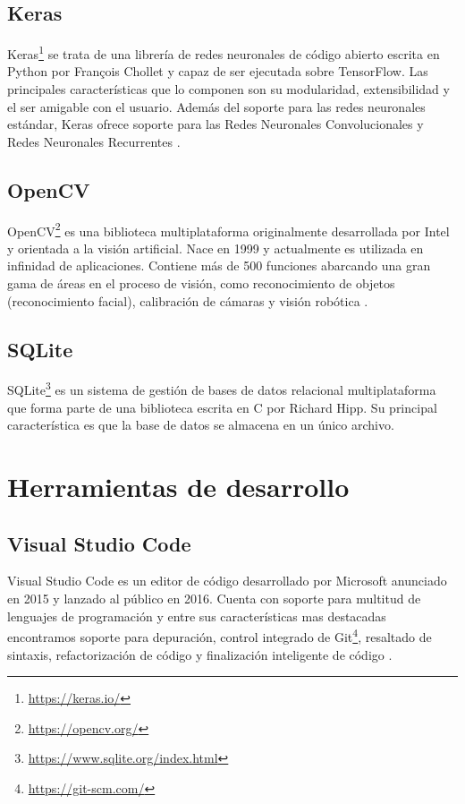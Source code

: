 \subsection{Keras}
Keras\footnote{\url{https://keras.io/}} se trata de una librería de redes neuronales de código abierto escrita en Python por François Chollet y capaz de ser ejecutada sobre TensorFlow. Las principales características que lo componen son su modularidad, extensibilidad y el ser amigable con el usuario. Además del soporte para las redes neuronales estándar, Keras ofrece soporte para las Redes Neuronales Convolucionales y Redes Neuronales Recurrentes \cite{wiki:keras}.


\subsection{OpenCV}
OpenCV\footnote{\url{https://opencv.org/}} es una biblioteca multiplataforma originalmente desarrollada por Intel y orientada a la visión artificial. Nace en 1999 y actualmente es utilizada en infinidad de aplicaciones. Contiene más de 500 funciones abarcando una gran gama de áreas en el proceso de visión, como reconocimiento de objetos (reconocimiento facial), calibración de cámaras y visión robótica \cite{wiki:opencv}.


\subsection{SQLite}
SQLite\footnote{\url{https://www.sqlite.org/index.html}} es un sistema de gestión de bases de datos relacional multiplataforma que forma parte de una biblioteca escrita en C por Richard Hipp. Su principal característica es que la base de datos se almacena en un único archivo.


\section{Herramientas de desarrollo}


\subsection{Visual Studio Code}
Visual Studio Code es un editor de código desarrollado por Microsoft anunciado en 2015 y lanzado al público en 2016. Cuenta con soporte para multitud de lenguajes de programación y entre sus características mas destacadas encontramos soporte para depuración, control integrado de Git\footnote{\url{https://git-scm.com/}}, resaltado de sintaxis, refactorización de código y  finalización inteligente de código \cite{wiki:vscode}.

